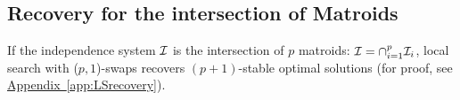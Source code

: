 



\subsection{Recovery for the intersection of Matroids}
If the independence system $\mathcal{I}$ is the intersection of $p$ matroids: $\mathcal{I}=\cap_{i=1}^p \mathcal{I}_i$, local search with ($p,1$)-swaps recovers $(p+1)$-stable optimal solutions (for proof, see \hyperref[app:LSrecovery]{Appendix~\ref{app:LSrecovery}}). 


